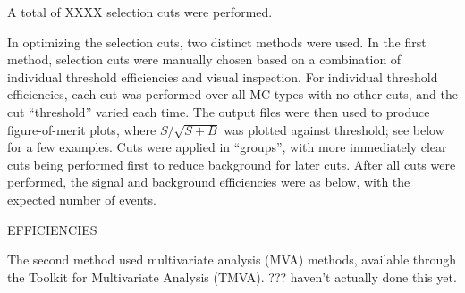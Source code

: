 \documentclass[12pt,a4paper]{article} %
\begin{document}
A total of XXXX selection cuts were performed.

In optimizing the selection cuts, two distinct methods were used. In the first method, selection cuts were manually chosen based on a combination of individual threshold efficiencies and visual inspection. For individual threshold efficiencies, each cut was performed over all MC types with no other cuts, and the cut ``threshold'' varied each time. The output files were then used to produce figure-of-merit plots, where $S/\sqrt{S+B}$ was plotted against threshold; see below for a few examples. Cuts were applied in ``groups'', with more immediately clear cuts being performed first to reduce background for later cuts. After all cuts were performed, the signal and background efficiencies were as below, with the expected number of events.

EFFICIENCIES

The second method used multivariate analysis (MVA) methods, available through the Toolkit for Multivariate Analysis (TMVA). ??? haven't actually done this yet.
\end{document}
